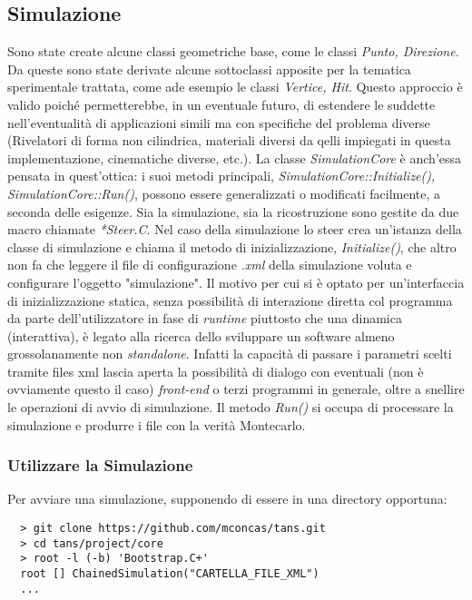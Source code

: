 \documentclass{article}
\begin{document}
\subsection{Simulazione}
Sono state create alcune classi geometriche base, come le classi \textit{Punto, Direzione}.
Da queste sono state derivate alcune sottoclassi apposite per la tematica sperimentale trattata, come ade esempio le classi \textit{Vertice, Hit}.\newline
Questo approccio è valido poiché permetterebbe, in un eventuale futuro, di estendere le suddette nell'eventualità di applicazioni simili ma con specifiche del problema diverse (Rivelatori di forma non cilindrica, materiali diversi da qelli impiegati in questa implementazione, cinematiche diverse, etc.).\newline
La classe \textit{SimulationCore} è anch'essa pensata in quest'ottica:
i suoi metodi principali, \textit{SimulationCore::Initialize(), SimulationCore::Run()}, possono essere generalizzati o modificati facilmente, a seconda delle esigenze.
Sia la simulazione, sia la ricostruzione sono gestite da due macro chiamate \textit{*Steer.C}.\newline
Nel caso della simulazione lo steer crea un'istanza della classe di simulazione e chiama il metodo di inizializzazione, \textit{Initialize()}, che altro non fa che leggere il file di configurazione \textit{.xml} della simulazione voluta e configurare l'oggetto "simulazione".\newline
Il motivo per cui si è optato per un'interfaccia di inizializzazione statica, senza possibilità di interazione diretta col programma da parte dell'utilizzatore in fase di \textit{runtime} piuttosto che una dinamica (interattiva), è legato alla ricerca dello sviluppare un software almeno grossolanamente non \textit{standalone}. Infatti la capacità di passare i parametri scelti tramite files xml lascia aperta la possibilità di dialogo con eventuali (non è ovviamente questo il caso) \textit{front-end} o terzi programmi in generale, oltre a snellire le operazioni di avvio di simulazione. \newline
Il metodo \textit{Run()} si occupa di processare la simulazione e produrre i file con la verità Montecarlo.
\subsubsection{Utilizzare la Simulazione}
\noindent Per avviare una simulazione, supponendo di essere in una directory opportuna:
\begin{verbatim}
  > git clone https://github.com/mconcas/tans.git
  > cd tans/project/core
  > root -l (-b) 'Bootstrap.C+'
  root [] ChainedSimulation("CARTELLA_FILE_XML")
  ...
  
\end{verbatim}
\end{document}
